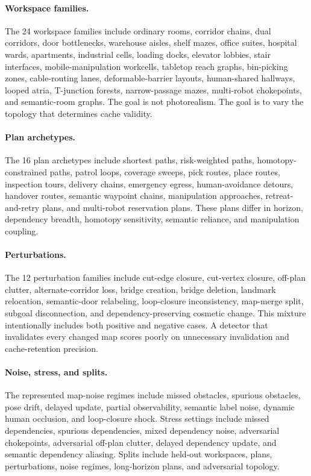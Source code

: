 \documentclass{article}
\begin{document}
\paragraph{Workspace families.}
The 24 workspace families include ordinary rooms, corridor chains, dual corridors, door bottlenecks, warehouse aisles, shelf mazes, office suites, hospital wards, apartments, industrial cells, loading docks, elevator lobbies, stair interfaces, mobile-manipulation workcells, tabletop reach graphs, bin-picking zones, cable-routing lanes, deformable-barrier layouts, human-shared hallways, looped atria, T-junction forests, narrow-passage mazes, multi-robot chokepoints, and semantic-room graphs. The goal is not photorealism. The goal is to vary the topology that determines cache validity.

\paragraph{Plan archetypes.}
The 16 plan archetypes include shortest paths, risk-weighted paths, homotopy-constrained paths, patrol loops, coverage sweeps, pick routes, place routes, inspection tours, delivery chains, emergency egress, human-avoidance detours, handover routes, semantic waypoint chains, manipulation approaches, retreat-and-retry plans, and multi-robot reservation plans. These plans differ in horizon, dependency breadth, homotopy sensitivity, semantic reliance, and manipulation coupling.

\paragraph{Perturbations.}
The 12 perturbation families include cut-edge closure, cut-vertex closure, off-plan clutter, alternate-corridor loss, bridge creation, bridge deletion, landmark relocation, semantic-door relabeling, loop-closure inconsistency, map-merge split, subgoal disconnection, and dependency-preserving cosmetic change. This mixture intentionally includes both positive and negative cases. A detector that invalidates every changed map scores poorly on unnecessary invalidation and cache-retention precision.

\paragraph{Noise, stress, and splits.}
The represented map-noise regimes include missed obstacles, spurious obstacles, pose drift, delayed update, partial observability, semantic label noise, dynamic human occlusion, and loop-closure shock. Stress settings include missed dependencies, spurious dependencies, mixed dependency noise, adversarial chokepoints, adversarial off-plan clutter, delayed dependency update, and semantic dependency aliasing. Splits include held-out workspaces, plans, perturbations, noise regimes, long-horizon plans, and adversarial topology.
\end{document}
